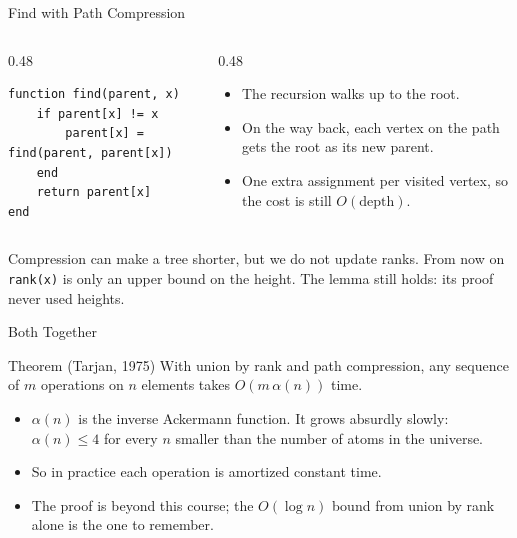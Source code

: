 \documentclass[10pt,aspectratio=169]{beamer}
\begin{document}
\begin{frame}[fragile]{Find with Path Compression}
  \begin{columns}[c]
    \begin{column}{0.48\textwidth}
\begin{lstlisting}
function find(parent, x)
    if parent[x] != x
        parent[x] = find(parent, parent[x])
    end
    return parent[x]
end
\end{lstlisting}
    \end{column}
    \begin{column}{0.48\textwidth}
      \begin{itemize}
        \item The recursion walks up to the root.
        \item On the way back, each vertex on the path gets the root as its
              new parent.
        \item One extra assignment per visited vertex, so the cost is still
              $O(\text{depth})$.
      \end{itemize}
    \end{column}
  \end{columns}

  \bigskip
  Compression can make a tree \alert{shorter}, but we do not update ranks.
  From now on \texttt{rank(x)} is only an \alert{upper bound} on the height.
  The lemma still holds: its proof never used heights.
\end{frame}

\begin{frame}{Both Together}
  \begin{block}{Theorem (Tarjan, 1975)}
    With union by rank and path compression, any sequence of $m$
    operations on $n$ elements takes $O(m \, \alpha(n))$ time.
  \end{block}

  \bigskip
  \begin{itemize}
    \item $\alpha(n)$ is the \alert{inverse Ackermann function}. It grows
          absurdly slowly: $\alpha(n) \le 4$ for every $n$ smaller than the
          number of atoms in the universe.
    \item So in practice each operation is \alert{amortized constant} time.
    \item The proof is beyond this course; the $O(\log n)$ bound from union
          by rank alone is the one to remember.
  \end{itemize}
\end{frame}
\end{document}
